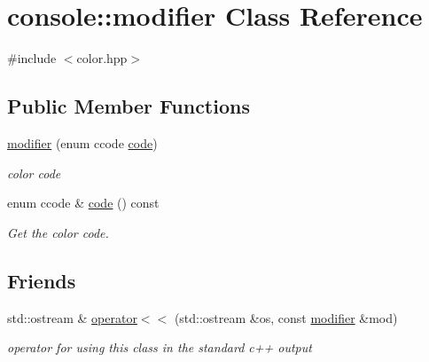 \hypertarget{classconsole_1_1modifier}{}\section{console\+:\+:modifier Class Reference}
\label{classconsole_1_1modifier}


{\ttfamily \#include $<$color.\+hpp$>$}

\subsection*{Public Member Functions}
\begin{DoxyCompactItemize}
\item 
\hyperlink{classconsole_1_1modifier_a0ec578bb4ac2f0bb56da5e9995fe14fe}{modifier} (enum ccode \hyperlink{classconsole_1_1modifier_ad525a786ab7b18058ca2b3e120a7ba0a}{code})
\begin{DoxyCompactList}\small\item\em color code \end{DoxyCompactList}\item 
\hypertarget{classconsole_1_1modifier_ad525a786ab7b18058ca2b3e120a7ba0a}{}enum ccode \& \hyperlink{classconsole_1_1modifier_ad525a786ab7b18058ca2b3e120a7ba0a}{code} () const \label{classconsole_1_1modifier_ad525a786ab7b18058ca2b3e120a7ba0a}

\begin{DoxyCompactList}\small\item\em Get the color code. \end{DoxyCompactList}\end{DoxyCompactItemize}
\subsection*{Friends}
\begin{DoxyCompactItemize}
\item 
\hypertarget{classconsole_1_1modifier_a1a697ad41039adb38c769e442c0238d8}{}std\+::ostream \& \hyperlink{classconsole_1_1modifier_a1a697ad41039adb38c769e442c0238d8}{operator$<$$<$} (std\+::ostream \&os, const \hyperlink{classconsole_1_1modifier}{modifier} \&mod)\label{classconsole_1_1modifier_a1a697ad41039adb38c769e442c0238d8}

\begin{DoxyCompactList}\small\item\em operator for using this class in the standard c++ output \end{DoxyCompactList}\end{DoxyCompactItemize}


